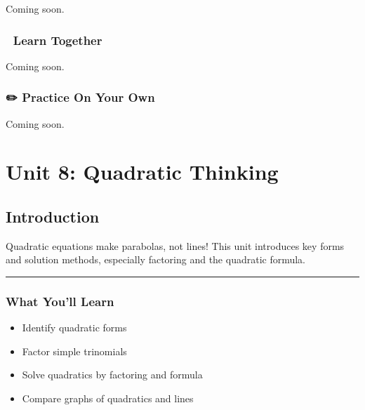 \documentclass[
  letterpaper,
  DIV=11,
  numbers=noendperiod]{scrreprt}
\providecommand{\tightlist}{%
  \setlength{\itemsep}{0pt}\setlength{\parskip}{0pt}}
\begin{document}

Coming soon.

\section*{🧠 Learn Together}\label{learn-together-38}


Coming soon.

\section*{✏️ Practice On Your Own}\label{practice-on-your-own-38}


Coming soon.

\part{Unit 8: Quadratic Thinking}

\chapter*{Introduction}\label{introduction-7}


Quadratic equations make parabolas, not lines! This unit introduces key
forms and solution methods, especially factoring and the quadratic
formula.

\begin{center}\rule{0.5\linewidth}{0.5pt}\end{center}

\section*{What You'll Learn}\label{what-youll-learn-7}


\begin{itemize}
\tightlist
\item
  Identify quadratic forms
\item
  Factor simple trinomials
\item
  Solve quadratics by factoring and formula
\item
  Compare graphs of quadratics and lines
\end{itemize}
\end{document}
